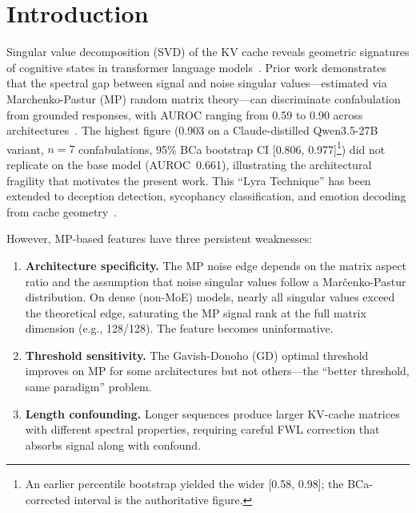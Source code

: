 \documentclass[11pt,a4paper]{article}
\begin{document}
\section{Introduction}
\label{sec:intro}

Singular value decomposition (SVD) of the KV cache reveals geometric
signatures of cognitive states in transformer language
models~\citep{lyra_p2}. Prior work demonstrates that the spectral gap
between signal and noise singular values---estimated via
Marchenko-Pastur (MP) random matrix theory---can discriminate
confabulation from grounded responses, with AUROC ranging from 0.59
to 0.90 across architectures~\citep{lyra_p7}. The highest figure
(0.903 on a Claude-distilled Qwen3.5-27B variant, $n=7$ confabulations,
95\% BCa bootstrap CI [0.806, 0.977]\footnote{An earlier percentile
bootstrap yielded the wider [0.58, 0.98]; the BCa-corrected interval
is the authoritative figure.}) did not replicate on the base model
(AUROC~0.661), illustrating the architectural fragility that motivates
the present work. This ``Lyra Technique''
has been extended to deception detection, sycophancy classification,
and emotion decoding from cache geometry~\citep{lyra_p4}.

However, MP-based features have three persistent weaknesses:

\begin{enumerate}
\item \textbf{Architecture specificity.} The MP noise edge depends on
  the matrix aspect ratio and the assumption that noise singular
  values follow a Mar\v{c}enko-Pastur distribution. On dense
  (non-MoE) models, nearly all singular values exceed the theoretical
  edge, saturating the MP signal rank at the full matrix dimension
  (e.g., 128/128). The feature becomes uninformative.

\item \textbf{Threshold sensitivity.} The Gavish-Donoho (GD) optimal
  threshold improves on MP for some architectures but not
  others---the ``better threshold, same paradigm'' problem.

\item \textbf{Length confounding.} Longer sequences produce larger
  KV-cache matrices with different spectral properties, requiring
  careful FWL correction that absorbs signal along with confound.
\end{enumerate}
\end{document}
